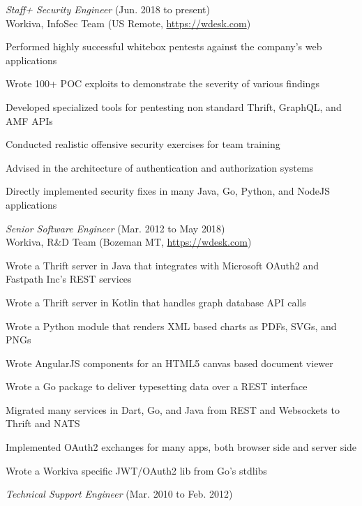 \documentclass[10pt, a4paper]{article}
\begin{document}
\begin{itemize*}
  \item \emph{Staff+ Security Engineer} (Jun. 2018 to present)\\
    Workiva, InfoSec Team (US Remote, \url{https://wdesk.com})
    \begin{itemize*}
    \item Performed highly successful whitebox pentests against the company's web applications
    \item Wrote 100+ POC exploits to demonstrate the severity of various findings
    \item Developed specialized tools for pentesting non standard Thrift, GraphQL, and AMF APIs
    \item Conducted realistic offensive security exercises for team training
    \item Advised in the architecture of authentication and authorization systems
    \item Directly implemented security fixes in many Java, Go, Python, and NodeJS applications
    \end{itemize*}
  \item \emph{Senior Software Engineer} (Mar. 2012 to May 2018)\\
    Workiva, R\&D Team (Bozeman MT, \url{https://wdesk.com})
    \begin{itemize*}
    \item Wrote a Thrift server in Java that integrates with Microsoft OAuth2 and Fastpath Inc's REST services
    \item Wrote a Thrift server in Kotlin that handles graph database API calls
    \item Wrote a Python module that renders XML based charts as PDFs, SVGs, and PNGs
    \item Wrote AngularJS components for an HTML5 canvas based document viewer
    \item Wrote a Go package to deliver typesetting data over a REST interface
    \item Migrated many services in Dart, Go, and Java from REST and Websockets to Thrift and NATS
    \item Implemented OAuth2 exchanges for many apps, both browser side and server side
    \item Wrote a Workiva specific JWT/OAuth2 lib from Go's stdlibs
    \end{itemize*}
  \item \emph{Technical Support Engineer} (Mar. 2010 to Feb. 2012)\\

\end{itemize*}
\end{document}
